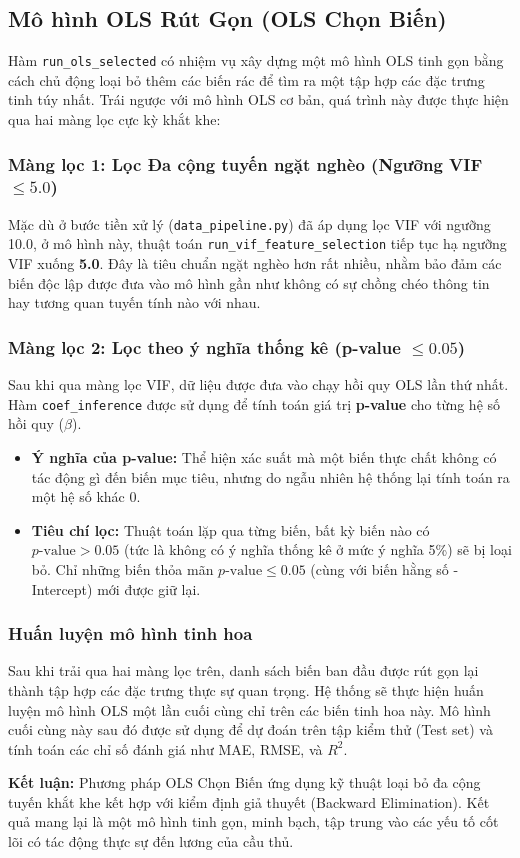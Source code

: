 \subsection{Mô hình OLS Rút Gọn (OLS Chọn Biến)}

Hàm \texttt{run\_ols\_selected} có nhiệm vụ xây dựng một mô hình OLS tinh gọn bằng cách chủ động loại bỏ thêm các biến rác để tìm ra một tập hợp các đặc trưng tinh túy nhất. Trái ngược với mô hình OLS cơ bản, quá trình này được thực hiện qua hai màng lọc cực kỳ khắt khe:

\subsubsection{Màng lọc 1: Lọc Đa cộng tuyến ngặt nghèo (Ngưỡng VIF $\le 5.0$)}
Mặc dù ở bước tiền xử lý (\texttt{data\_pipeline.py}) đã áp dụng lọc VIF với ngưỡng 10.0, ở mô hình này, thuật toán \texttt{run\_vif\_feature\_selection} tiếp tục hạ ngưỡng VIF xuống \textbf{5.0}. Đây là tiêu chuẩn ngặt nghèo hơn rất nhiều, nhằm bảo đảm các biến độc lập được đưa vào mô hình gần như không có sự chồng chéo thông tin hay tương quan tuyến tính nào với nhau.

\subsubsection{Màng lọc 2: Lọc theo ý nghĩa thống kê (p-value $\le 0.05$)}
Sau khi qua màng lọc VIF, dữ liệu được đưa vào chạy hồi quy OLS lần thứ nhất. Hàm \texttt{coef\_inference} được sử dụng để tính toán giá trị \textbf{p-value} cho từng hệ số hồi quy ($\beta$).
\begin{itemize}
    \item \textbf{Ý nghĩa của p-value:} Thể hiện xác suất mà một biến thực chất không có tác động gì đến biến mục tiêu, nhưng do ngẫu nhiên hệ thống lại tính toán ra một hệ số khác 0.
    \item \textbf{Tiêu chí lọc:} Thuật toán lặp qua từng biến, bất kỳ biến nào có $p\text{-value} > 0.05$ (tức là không có ý nghĩa thống kê ở mức ý nghĩa 5\%) sẽ bị loại bỏ. Chỉ những biến thỏa mãn $p\text{-value} \le 0.05$ (cùng với biến hằng số - Intercept) mới được giữ lại.
\end{itemize}

\subsubsection{Huấn luyện mô hình tinh hoa}
Sau khi trải qua hai màng lọc trên, danh sách biến ban đầu được rút gọn lại thành tập hợp các đặc trưng thực sự quan trọng. Hệ thống sẽ thực hiện huấn luyện mô hình OLS một lần cuối cùng chỉ trên các biến tinh hoa này. Mô hình cuối cùng này sau đó được sử dụng để dự đoán trên tập kiểm thử (Test set) và tính toán các chỉ số đánh giá như MAE, RMSE, và $R^2$.

\textbf{Kết luận:} Phương pháp OLS Chọn Biến ứng dụng kỹ thuật loại bỏ đa cộng tuyến khắt khe kết hợp với kiểm định giả thuyết (Backward Elimination). Kết quả mang lại là một mô hình tinh gọn, minh bạch, tập trung vào các yếu tố cốt lõi có tác động thực sự đến lương của cầu thủ.
